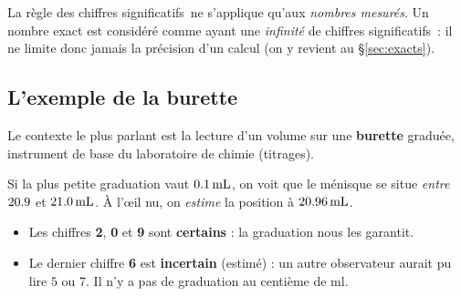 \documentclass[11pt,a4paper]{article}
\newcommand{\CS}{chiffres significatifs}
\begin{document}
\begin{remarque}
La règle des \CS\ ne s'applique qu'aux \emph{nombres mesurés}. Un nombre exact est considéré comme
ayant une \emph{infinité} de \CS\ : il ne limite donc jamais la précision d'un calcul (on y revient
au \S\ref{sec:exacts}).
\end{remarque}

\subsection{L'exemple de la burette}

Le contexte le plus parlant est la lecture d'un volume sur une \textbf{burette} graduée, instrument
de base du laboratoire de chimie (titrages).

\begin{center}
\end{center}

\noindent Si la plus petite graduation vaut $\qty{0{,}1}{\milli\litre}$, on voit que le ménisque
se situe \emph{entre} $\qty{20{,}9}{}$ et $\qty{21{,}0}{\milli\litre}$. À l'\oe il nu, on
\emph{estime} la position à $\qty{20{,}96}{\milli\litre}$.

\begin{itemize}[leftmargin=1.6em,topsep=3pt]
  \item Les chiffres \textbf{2}, \textbf{0} et \textbf{9} sont \textcolor{certaincol}{\textbf{certains}} :
        la graduation nous les garantit.
  \item Le dernier chiffre \textbf{6} est \textcolor{doutecol}{\textbf{incertain}} (estimé) : un autre
        observateur aurait pu lire $5$ ou $7$. Il n'y a pas de graduation au centième de \si{\milli\litre}.
\end{itemize}
\end{document}
